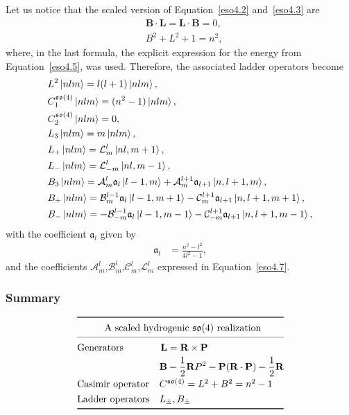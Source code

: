 \documentclass[12pt,a4paper]{report}
\theoremstyle{definition}
\theoremstyle{remark}
\theoremstyle{remark}
\begin{document}
Let us notice that the scaled version of Equation~\ref{eso4.2} and~\ref{eso4.3} are
\begin{align*}
&\textbf{B}\cdot\textbf{L}=\textbf{L}\cdot\textbf{B}=0,\\
&B^2+L^2+1=n^2,
\end{align*}
where, in the last formula, the explicit expression for the energy from Equation~\ref{eso4.5}, was used. 
Therefore, the associated ladder operators become
\begin{equation}\label{eso4scaled.2}
\begin{aligned}
&L^2\ket{nlm}=l(l+1)\ket{nlm},\\
&C^{\mathfrak{so}(4)}_1\ket{nlm}=(n^2-1)\ket{nlm},\\
&C^{\mathfrak{so}(4)}_2\ket{nlm}=0,\\
&L_3\ket{nlm}=m\ket{nlm},\\
&L_+\ket{nlm}=\mathcal{L}_m^l\ket{nl,m+1},\\
&L_-\ket{nlm}=\mathcal{L}_{-m}^l\ket{nl,m-1},\\
&B_3\ket{nlm}=\mathcal{A}_m^l\mathfrak{a}_l\ket{l-1,m}+\mathcal{A}_m^{l+1}\mathfrak{a}_{l+1}\ket{n,l+1,m},\\
&B_+\ket{nlm}=\mathcal{B}_m^{l-1}\mathfrak{a}_l\ket{l-1,m+1}-\mathcal{C}_m^{l+1}\mathfrak{a}_{l+1}\ket{n,l+1,m+1},\\
&B_-\ket{nlm}=-\mathcal{B}_{-m}^{l-1}\mathfrak{a}_l\ket{l-1,m-1}-\mathcal{C}_{-m}^{l+1}\mathfrak{a}_{l+1}\ket{n,l+1,m-1},
\end{aligned}
\end{equation}
with the coefficient $\mathfrak{a}_l$ given by
\begin{equation}\label{eso4scaled.3}
\begin{aligned}
\mathfrak{a}_l&=\frac{n^2-l^2}{4l^2-1},
\end{aligned}
\end{equation}
and the coefficients $\mathcal{A}_m^l$,$\mathcal{B}_m^l$,$\mathcal{C}_m^l$,$\mathcal{L}_m^l$ expressed in Equation~\ref{eso4.7}.

\subsubsection{Summary}
\begin{equation*}
\def\arraystretch{1.3}
\begin{array}{@{}ll@{}}
\toprule
 \multicolumn{2}{c@{}}{\text{A scaled hydrogenic }\mathfrak{so}(4) \text{ realization}} \\
\cmidrule{1-2}
 \text{Generators} & \begin{aligned}[t]
 \textbf{L}&=\textbf{R}\times\textbf{P}\\
  \textbf{B}&-\frac{1}{2}\textbf{R}P^2-\textbf{P}(\textbf{R}\cdot\textbf{P})-\frac{1}{2}\textbf{R}\\
  \end{aligned}\\
 \text{Casimir operator} & C^{\mathfrak{so}(4)}=L^2+B^2=n^2-1\\
 \text{Ladder operators} & L_\pm,B_\pm\\
\bottomrule
\end{array}
\end{equation*}
\end{document}
